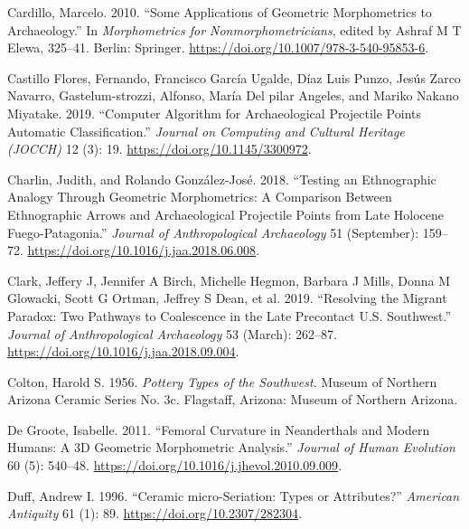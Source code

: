 \documentclass{article}
\newlength{\cslhangindent}
\newlength{\cslentryspacingunit} %
\newenvironment{CSLReferences}[2] %
 {%
  \setlength{\parindent}{0pt}
  \ifodd #1
  \let\oldpar\par
  \def\par{\hangindent=\cslhangindent\oldpar}
  \fi
  \setlength{\parskip}{#2\cslentryspacingunit}
 }%
 {}
\begin{document}
\begin{CSLReferences}{1}{0}
\leavevmode{}%
Cardillo, Marcelo. 2010. {``{Some Applications of Geometric
Morphometrics to Archaeology}.''} In \emph{{Morphometrics for
Nonmorphometricians}}, edited by Ashraf M T Elewa, 325--41. Berlin:
Springer. \url{https://doi.org/10.1007/978-3-540-95853-6}.

\leavevmode{}%
Castillo Flores, Fernando, Francisco García Ugalde, Díaz Luis Punzo,
Jesús Zarco Navarro, Gastelum-strozzi, Alfonso, María Del pilar Angeles,
and Mariko Nakano Miyatake. 2019. {``{Computer Algorithm for
Archaeological Projectile Points Automatic Classification}.''}
\emph{Journal on Computing and Cultural Heritage (JOCCH)} 12 (3): 19.
\url{https://doi.org/10.1145/3300972}.

\leavevmode{}%
Charlin, Judith, and Rolando González-José. 2018. {``{Testing an
Ethnographic Analogy Through Geometric Morphometrics: A Comparison
Between Ethnographic Arrows and Archaeological Projectile Points from
Late Holocene Fuego-Patagonia}.''} \emph{Journal of Anthropological
Archaeology} 51 (September): 159--72.
\url{https://doi.org/10.1016/j.jaa.2018.06.008}.

\leavevmode{}%
Clark, Jeffery J, Jennifer A Birch, Michelle Hegmon, Barbara J Mills,
Donna M Glowacki, Scott G Ortman, Jeffrey S Dean, et al. 2019.
{``{Resolving the Migrant Paradox: Two Pathways to Coalescence in the
Late Precontact U.S. Southwest}.''} \emph{Journal of Anthropological
Archaeology} 53 (March): 262--87.
\url{https://doi.org/10.1016/j.jaa.2018.09.004}.

\leavevmode{}%
Colton, Harold S. 1956. \emph{{Pottery Types of the Southwest}}. Museum
of Northern Arizona Ceramic Series No. 3c. Flagstaff, Arizona: Museum of
Northern Arizona.

\leavevmode{}%
De Groote, Isabelle. 2011. {``{Femoral Curvature in Neanderthals and
Modern Humans: A {3D} Geometric Morphometric Analysis}.''} \emph{Journal
of Human Evolution} 60 (5): 540--48.
\url{https://doi.org/10.1016/j.jhevol.2010.09.009}.

\leavevmode{}%
Duff, Andrew I. 1996. {``{Ceramic {micro-Seriation}: Types or
Attributes?}''} \emph{American Antiquity} 61 (1): 89.
\url{https://doi.org/10.2307/282304}.


\end{CSLReferences}
\end{document}
